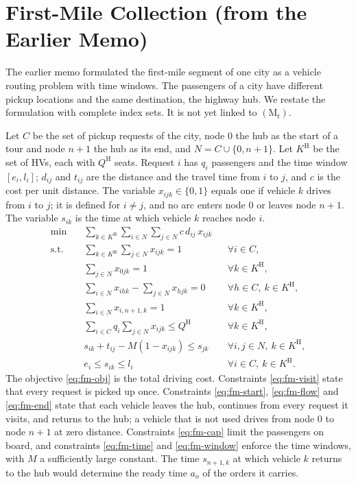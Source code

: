 \documentclass[12pt]{article}
\theoremstyle{plain}
\theoremstyle{definition}
\begin{document}
\section{First-Mile Collection (from the Earlier Memo)}\label{app:firstmile}

The earlier memo formulated the first-mile segment of one city as a vehicle routing problem with time windows. The passengers of a city have different pickup locations and the same destination, the highway hub. We restate the formulation with complete index sets. It is not yet linked to $(\mathrm{M}_t)$.

Let $C$ be the set of pickup requests of the city, node $0$ the hub as the start of a tour and node $n+1$ the hub as its end, and $N=C\cup\{0,n+1\}$. Let $K^{\mathrm{H}}$ be the set of HVs, each with $Q^{\mathrm{H}}$ seats. Request $i$ has $q_i$ passengers and the time window $[e_i,l_i]$; $d_{ij}$ and $t_{ij}$ are the distance and the travel time from $i$ to $j$, and $c$ is the cost per unit distance. The variable $x_{ijk}\in\{0,1\}$ equals one if vehicle $k$ drives from $i$ to $j$; it is defined for $i\neq j$, and no arc enters node $0$ or leaves node $n+1$. The variable $s_{ik}$ is the time at which vehicle $k$ reaches node $i$.
\begin{align}
\min\quad & \sum_{k\in K^{\mathrm{H}}}\sum_{i\in N}\sum_{j\in N} c\,d_{ij}\,x_{ijk} \label{eq:fm-obj}\\
\text{s.t.}\quad
& \sum_{k\in K^{\mathrm{H}}}\sum_{j\in N} x_{ijk}=1 && \forall i\in C, \label{eq:fm-visit}\\
& \sum_{j\in N} x_{0jk}=1 && \forall k\in K^{\mathrm{H}}, \label{eq:fm-start}\\
& \sum_{i\in N} x_{ihk}-\sum_{j\in N} x_{hjk}=0 && \forall h\in C,\ k\in K^{\mathrm{H}}, \label{eq:fm-flow}\\
& \sum_{i\in N} x_{i,n+1,k}=1 && \forall k\in K^{\mathrm{H}}, \label{eq:fm-end}\\
& \sum_{i\in C} q_i\sum_{j\in N} x_{ijk}\le Q^{\mathrm{H}} && \forall k\in K^{\mathrm{H}}, \label{eq:fm-cap}\\
& s_{ik}+t_{ij}-M(1-x_{ijk})\le s_{jk} && \forall i,j\in N,\ k\in K^{\mathrm{H}}, \label{eq:fm-time}\\
& e_i\le s_{ik}\le l_i && \forall i\in C,\ k\in K^{\mathrm{H}}. \label{eq:fm-window}
\end{align}
The objective \eqref{eq:fm-obj} is the total driving cost. Constraints \eqref{eq:fm-visit} state that every request is picked up once. Constraints \eqref{eq:fm-start}, \eqref{eq:fm-flow} and \eqref{eq:fm-end} state that each vehicle leaves the hub, continues from every request it visits, and returns to the hub; a vehicle that is not used drives from node $0$ to node $n+1$ at zero distance. Constraints \eqref{eq:fm-cap} limit the passengers on board, and constraints \eqref{eq:fm-time} and \eqref{eq:fm-window} enforce the time windows, with $M$ a sufficiently large constant. The time $s_{n+1,k}$ at which vehicle $k$ returns to the hub would determine the ready time $a_o$ of the orders it carries.
\end{document}
